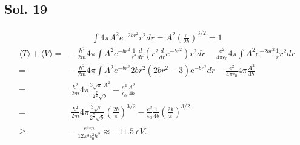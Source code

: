 \subsection*{Sol. 19}
\begin{align*}
    \int4\pi A^2e^{-2br^2}r^2dr = A^2\left(\frac{\pi}{2b}\right)^{3/2}=1
\end{align*}
\begin{align*}
    \langle T\rangle + \langle V\rangle
    =& -\frac{\hbar^2}{2m}
    4\pi
    \int
    A^2e^{-br^2}
    \frac{1}{r^2}\frac{d}{dr}(r^2\frac{d}{dr}e^{-br^2})r^2dr
    -\frac{e^2}{4\pi\epsilon_0}
    4\pi\int A^2e^{-2br^2}\frac{1}{r}r^2dr\\
=&
-\frac{\hbar^2}{2m}4\pi\int A^2e^{-br^2}2br^{2} \left(2br^{2} - 3\right) \mathrm{e}^{-br^{2}}dr
-\frac{e^2}{4\pi\epsilon_0}
    4\pi\frac{A^2}{4b}\\
    =&
    \frac{\hbar^2}{2m}4\pi
    \frac{3 \sqrt{\pi} \, A^{2}}{2^{\frac{7}{2}} \sqrt{b}}
    -\frac{e^2}{\epsilon_0}\frac{A^2}{4b}\\
    =&
    \frac{\hbar^2}{2m}4\pi
    \frac{3 \sqrt{\pi} }{2^{\frac{7}{2}} \sqrt{b}}
    \left(\frac{2b}{\pi}\right)^{3/2}
    -\frac{e^2}{\epsilon_0}\frac{1}{4b}
    \left(\frac{2b}{\pi}\right)^{3/2}\\
    \geq& - \frac{e^{4} m}{12 \pi^{3} \epsilon_{0}^{2} \hbar^{2}}\approx -\qty{11.5}{eV}.
\end{align*}

